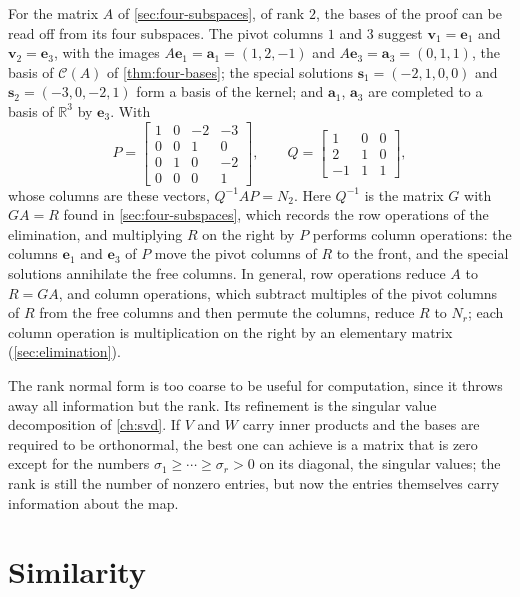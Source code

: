 For the matrix $A$ of \cref{sec:four-subspaces}, of rank $2$, the bases of the proof can be read off from its four subspaces. The pivot columns $1$ and $3$ suggest $\mathbf v_1=\mathbf e_1$ and $\mathbf v_2=\mathbf e_3$, with the images $A\mathbf e_1=\mathbf a_1=(1,2,-1)$ and $A\mathbf e_3=\mathbf a_3=(0,1,1)$, the basis of $\mathcal C(A)$ of \cref{thm:four-bases}; the special solutions $\mathbf s_1=(-2,1,0,0)$ and $\mathbf s_2=(-3,0,-2,1)$ form a basis of the kernel; and $\mathbf a_1$, $\mathbf a_3$ are completed to a basis of $\mathbb R^3$ by $\mathbf e_3$. With
\[
P=\begin{bmatrix}1&0&-2&-3\\0&0&1&0\\0&1&0&-2\\0&0&0&1\end{bmatrix},\qquad
Q=\begin{bmatrix}1&0&0\\2&1&0\\-1&1&1\end{bmatrix},
\]
whose columns are these vectors, $Q^{-1}AP=N_2$. Here $Q^{-1}$ is the matrix $G$ with $GA=R$ found in \cref{sec:four-subspaces}, which records the row operations of the elimination, and multiplying $R$ on the right by $P$ performs column operations: the columns $\mathbf e_1$ and $\mathbf e_3$ of $P$ move the pivot columns of $R$ to the front, and the special solutions annihilate the free columns. In general, row operations reduce $A$ to $R=GA$, and column operations, which subtract multiples of the pivot columns of $R$ from the free columns and then permute the columns, reduce $R$ to $N_r$; each column operation is multiplication on the right by an elementary matrix (\cref{sec:elimination}).

The rank normal form is too coarse to be useful for computation, since it throws away all information but the rank. Its refinement is the singular value decomposition of \cref{ch:svd}. If $V$ and $W$ carry inner products and the bases are required to be orthonormal, the best one can achieve is a matrix that is zero except for the numbers $\sigma_1\ge\cdots\ge\sigma_r>0$ on its diagonal, the singular values; the rank is still the number of nonzero entries, but now the entries themselves carry information about the map.

\section{Similarity}
\label{sec:similarity}

